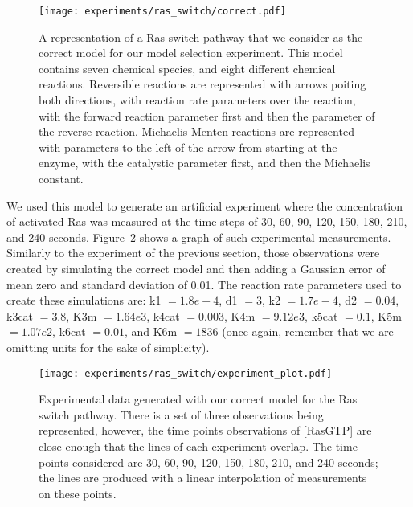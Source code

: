 \begin{figure}[H]
\begin{center}
\texttt{[image: experiments/ras\_switch/correct.pdf]}
\caption{A representation of a Ras switch pathway that we consider as
    the correct model for our model selection experiment. This model
    contains seven chemical species, and eight different chemical
    reactions. Reversible reactions are represented with arrows poiting
    both directions, with reaction rate parameters over the reaction,
    with the forward reaction parameter first and then the parameter of
    the reverse reaction. Michaelis-Menten reactions are represented
    with parameters to the left of the arrow from starting at the
    enzyme, with the catalystic parameter first, and then the Michaelis
    constant.
}
\label{fig:ras_switch:correct_model}
\end{center}
\end{figure}

We used this model to generate an artificial experiment where the
concentration of activated Ras was measured at the time steps of 30,
60, 90, 120, 150, 180, 210, and 240 seconds.
Figure~\ref{fig:ras_switch:experimental_observations} shows a graph of
such experimental measurements. Similarly to the experiment of the 
previous section, those observations were created by simulating the 
correct model and then adding a Gaussian error of mean zero and standard
deviation of 0.01. The reaction rate parameters used to create these
simulations are: k1 $= 1.8e-4$, d1 $= 3$, k2 $= 1.7e-4$, d2 $=0.04$,
k3cat $= 3.8$, K3m $=1.64e3$, k4cat $= 0.003$, K4m $= 9.12e3$, k5cat
$= 0.1$, K5m $= 1.07e2$, k6cat $= 0.01$, and K6m $=1836$ (once again,
remember that we are omitting units for the sake of simplicity).

\begin{figure}[H]
\begin{center}
\texttt{[image: experiments/ras\_switch/experiment\_plot.pdf]}
\caption{Experimental data generated with our correct model for the Ras
    switch pathway. There is a set of three observations being
    represented, however, the time points observations of [RasGTP] are
    close enough that the lines of each experiment overlap. The time
    points considered are 30, 60, 90, 120, 150, 180, 210, and 240
    seconds; the lines are produced with a linear interpolation of
    measurements on these points.}
\label{fig:ras_switch:experimental_observations}
\end{center}
\end{figure}

